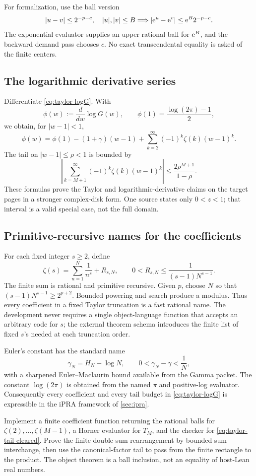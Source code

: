 For formalization, use the ball version
\[
 |u-v|\le2^{-p-c},\quad |u|,|v|\le B
 \Longrightarrow
 |\mathrm e^u-\mathrm e^v|\le \mathrm e^B2^{-p-c}.
\]
The exponential evaluator supplies an upper rational ball for \(\mathrm e^B\), and
the backward demand pass chooses \(c\).  No exact transcendental equality is
asked of the finite centers.

\subsection{The logarithmic derivative series}

Differentiate \cref{eq:taylor-logG}.  With
\[
 \phi(w):=\frac{d}{dw}\log G(w),
 \qquad
 \phi(1)=\frac{\log(2\pi)-1}{2},
\]
we obtain, for \(|w-1|<1\),
\begin{equation}\label{eq:phi-taylor}
 \phi(w)=\phi(1)-(1+\gamma)(w-1)
 +\sum_{k=2}^{\infty}(-1)^k\zeta(k)(w-1)^k.
\end{equation}
The tail on \(|w-1|\le\rho<1\) is bounded by
\begin{equation}\label{eq:phi-tail}
 \left|\sum_{k=M+1}^{\infty}(-1)^k\zeta(k)(w-1)^k\right|
 \le \frac{2\rho^{M+1}}{1-\rho}.
\end{equation}
These formulas prove the Taylor and logarithmic-derivative claims on the target
pages in a stronger complex-disk form.  One source states only \(0<z<1\);
that interval is a valid special case, not the full domain.

\subsection{Primitive-recursive names for the coefficients}

For each fixed integer \(s\ge2\), define
\[
 \zeta(s)=\sum_{n=1}^{N}\frac1{n^s}+R_{s,N},
 \qquad
 0<R_{s,N}\le\frac{1}{(s-1)N^{s-1}}.
\]
The finite sum is rational and primitive recursive.  Given \(p\), choose
\(N\) so that
\((s-1)N^{s-1}\ge2^{p+2}\).  Bounded powering and search produce a modulus.
Thus every coefficient in a fixed Taylor truncation is a fast rational name.
The development never requires a single object-language function that accepts
an arbitrary code for \(s\); the external theorem schema introduces the finite
list of fixed \(s\)'s needed at each truncation order.

Euler's constant has the standard name
\[
 \gamma_N=H_N-\log N,
 \qquad
 0<\gamma_N-\gamma<\frac1N,
\]
with a sharpened Euler--Maclaurin bound available from the Gamma packet.  The
constant \(\log(2\pi)\) is obtained from the named \(\pi\) and positive-log
evaluator.  Consequently every coefficient and every tail budget in
\cref{eq:taylor-logG} is expressible in the iPRA framework of
\cref{sec:ipra}.

\begin{roadmap}
Implement a finite coefficient function returning the rational balls for
\(\zeta(2),\ldots,\zeta(M-1)\), a Horner evaluator for \(T_M\), and the checker
for \cref{eq:taylor-tail-cleared}.  Prove the finite double-sum rearrangement by
bounded sum interchange, then use the canonical-factor tail to pass from the
finite rectangle to the product.  The object theorem is a ball inclusion, not
an equality of host-Lean real numbers.
\end{roadmap}

